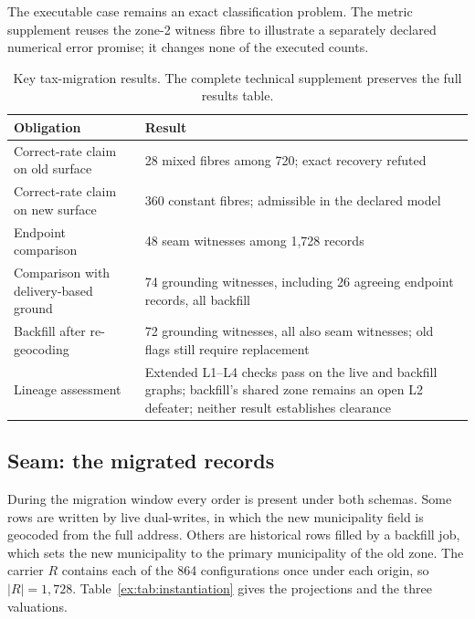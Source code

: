\documentclass[twocolumn,envcountsect,envcountsame,natbib]{svjour3}
\begin{document}
The executable case remains an exact classification problem. The metric supplement reuses the zone-2 witness fibre to illustrate a separately declared numerical error promise; it changes none of the executed counts.

\begin{table}[htbp]
\centering\small
\caption{Key tax-migration results. The complete technical supplement preserves the full results table.}
\label{ex:tab:case-results}
\begin{tabularx}{\textwidth}{@{}p{4.7cm}L@{}}
\toprule
Obligation & Result \\
\midrule
Correct-rate claim on old surface & 28 mixed fibres among 720; exact recovery refuted \\
Correct-rate claim on new surface & 360 constant fibres; admissible in the declared model \\
Endpoint comparison & 48 seam witnesses among 1,728 records \\
Comparison with delivery-based ground & 74 grounding witnesses, including 26 agreeing endpoint records, all backfill \\
Backfill after re-geocoding & 72 grounding witnesses, all also seam witnesses; old flags still require replacement \\
Lineage assessment & Extended L1--L4 checks pass on the live and backfill graphs; backfill's shared zone remains an open L2 defeater; neither result establishes clearance \\
\bottomrule
\end{tabularx}
\end{table}

\subsection{Seam: the migrated records}

During the migration window every order is present under both schemas. Some rows are written by live dual-writes, in which the new municipality field is geocoded from the full address. Others are historical rows filled by a backfill job, which sets the new municipality to the primary municipality of the old zone. The carrier $R$ contains each of the 864 configurations once under each origin, so $|R|=1{,}728$. Table~\ref{ex:tab:instantiation} gives the projections and the three valuations.
\end{document}
